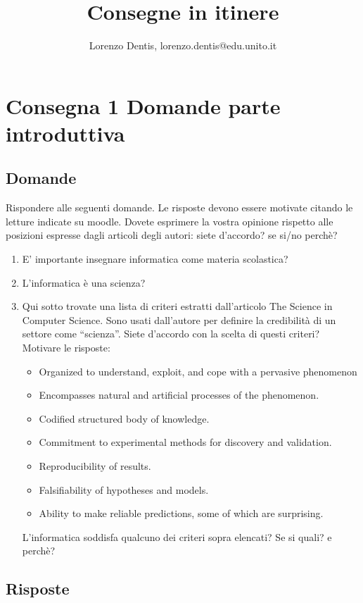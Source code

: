 \documentclass[a4paper]{article}
\begin{document}
\author{Lorenzo Dentis, lorenzo.dentis@edu.unito.it}
\title{Consegne in itinere}
\maketitle

\setcounter{tocdepth}{2}
\tableofcontents
\newpage
\section{Consegna 1 \large Domande parte introduttiva}

\subsection{Domande}
Rispondere alle seguenti domande. Le risposte devono essere motivate citando le letture indicate su moodle. Dovete esprimere la vostra opinione  rispetto alle posizioni espresse dagli articoli degli autori: siete d’accordo? se si/no perchè?
\newline
\begin{enumerate}
	\item E’ importante insegnare informatica come materia scolastica?
	\item L’informatica è una scienza?
	\item Qui sotto trovate una lista di criteri estratti dall’articolo The Science in Computer Science. Sono usati dall’autore per definire la credibilità di un settore come “scienza”. Siete d’accordo con la scelta di questi criteri? Motivare le risposte:
\begin{itemize}
	\item Organized to understand, exploit, and cope with a pervasive phenomenon
	\item Encompasses natural and artificial processes of the phenomenon.
	\item Codified structured body of knowledge.
	\item Commitment to experimental methods for discovery and validation.
	\item Reproducibility of results.
	\item Falsifiability of hypotheses and models.
	\item Ability to make reliable predictions, some of which are surprising.
\end{itemize}
	L’informatica soddisfa qualcuno dei criteri sopra elencati? Se si quali? e perchè?
\end{enumerate}
\newpage
\subsection{Risposte}
\end{document}
